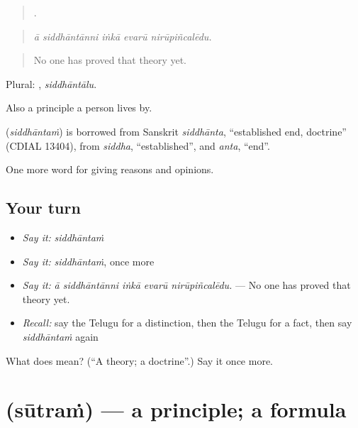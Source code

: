 \begin{quote}
    .
\end{quote}

\begin{quote}
\emph{ā siddhāntānni iṅkā evarū nirūpiñcalēdu.}
\end{quote}

\begin{quote}
No one has proved that theory yet.
\end{quote}

Plural: , \emph{siddhāntālu}.

Also a principle a person lives by.

\begin{cousinweb}
\textbf{} (\emph{siddhāntaṁ}) is borrowed from Sanskrit \emph{siddhānta}, \textquotedblleft{}established end, doctrine\textquotedblright{} (CDIAL 13404), from \emph{siddha}, \textquotedblleft{}established\textquotedblright{}, and \emph{anta}, \textquotedblleft{}end\textquotedblright{}.
\end{cousinweb}

\begin{grammarlens}[title={What you've built}]
One more word for giving reasons and opinions.
\end{grammarlens}

\subsection*{Your turn}
\begin{itemize}
\raggedright
  \item \emph{Say it:} \emph{siddhāntaṁ}
  \item \emph{Say it:} \emph{siddhāntaṁ}, once more
  \item \emph{Say it:} \emph{ā siddhāntānni iṅkā evarū nirūpiñcalēdu.} — No one has proved that theory yet.
  \item \emph{Recall:} say the Telugu for a distinction, then the Telugu for a fact, then say \emph{siddhāntaṁ} again
\end{itemize}

\begin{tcolorbox}[breakable,colback=teal!4,colframe=teal!35!black,title={Before you move on}]
What does  mean? (\textquotedblleft{}A theory; a doctrine\textquotedblright{}.) Say it once more.
\end{tcolorbox}
\section[\texorpdfstring{\te{సూత్రం} (sūtraṁ)}{సూత్రం (sūtraṁ)}]{ (sūtraṁ) — a principle; a formula}

